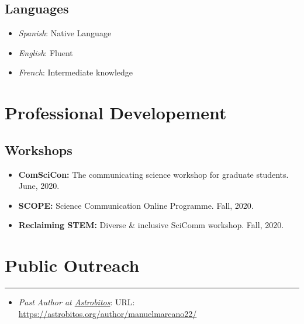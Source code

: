 \documentclass[letterpaper,10pt]{article}
\begin{document}

\subsection*{Languages}


    \begin{multicols}{2}


\begin{itemize}[label=$\blacktriangleright$]
\item \emph{Spanish}: Native Language
\item \emph{English}: Fluent
\item \emph{French}: Intermediate knowledge
\end{itemize}

\end{multicols}


\section*{Professional Developement}
\subsection*{Workshops}
\begin{itemize}[label=$\blacktriangleright$]
    \item \textbf{ComSciCon:} The communicating science workshop for graduate students. June, 2020.
    \item \textbf{SCOPE:} Science Communication Online Programme. Fall, 2020.
    \item \textbf{Reclaiming STEM:} Diverse \& inclusive SciComm workshop. Fall, 2020.
\end{itemize}


\section*{Public Outreach}
\hrule
\vspace{.3 cm}
\begin{itemize}[label=$\blacktriangleright$]
\item \emph{Past Author at \href{https://astrobitos.org/}{Astrobitos}}: URL: \url{https://astrobitos.org/author/manuelmarcano22/}
\end{itemize}
\end{document}
